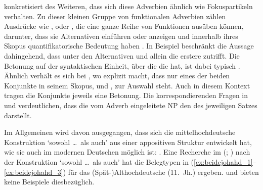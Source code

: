 \citet[425--428]{johannessen2005} konkretisiert des Weiteren, dass sich diese
Adverbien ähnlich wie Fokuspartikeln verhalten. Zu
dieser kleinen Gruppe von funktionalen Adverbien zählen Ausdrücke
wie ,  oder , die eine ganze Reihe von Funktionen
ausüben können, darunter, dass sie Alternativen einführen oder anzeigen und
innerhalb ihres Skopus quantifikatorische Bedeutung haben \autocite[vgl.][1--4,
15]{koenig1991}. In Beispiel  beschränkt  die
Aussage dahingehend, dass unter den Alternativen  und 
allein die erstere zutrifft. Die Betonung auf der syntaktischen Einheit, über
die die   hat, ist dabei typisch
\autocite[10--14]{koenig1991}. Ähnlich verhält es sich bei ,
wo  explizit macht, dass nur eines der beiden Konjunkte in seinem
Skopus,  und , zur Auswahl steht. Auch in diesem Kontext
tragen die Konjunkte jeweils eine Betonung. Die korrespondierenden Fragen in
 und  verdeutlichen, dass die vom
Adverb eingeleitete NP den  des jeweiligen Satzes
darstellt.

\begin{exe}
\end{exe}

Im Allgemeinen wird davon ausgegangen, dass sich die
mittelhochdeutsche Konstruktion 
`sowohl \dots\ als auch' aus einer appositiven Struktur
entwickelt hat, wie sie auch im modernen Deutschen möglich
ist:  \autocite[vgl.][626--627 und die
dortigen Referenzen]{ksw2}. Eine Recherche im  (;
\nosh\cite{ddd}) nach der Konstruktion  `sowohl \dots\
als auch' \autocite[vgl.][49]{schuetzeichel2012} hat die Belegtypen in
(\ref{ex:beidejohahd_1}--\ref{ex:beidejohahd_3}) für das
(Spät-)Althochdeutsche (11.~Jh.) ergeben. \citet{braune2018}
und \citet{schrodt2004} bieten keine Beispiele dies\-bezüglich.

